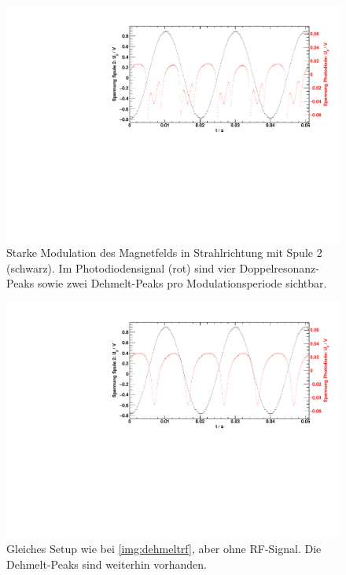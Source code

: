 \begin{figure}[H]
\begin{center}
  \includegraphics[width=\textwidth]{../img/part3/06.pdf}
  \caption{Starke Modulation des Magnetfelds in Strahlrichtung mit Spule 2 (schwarz).
   Im Photodiodensignal (rot) sind vier Doppelresonanz-Peaks sowie
   zwei Dehmelt-Peaks pro Modulationsperiode sichtbar.}
  \label{img:dehmeltrf}
\end{center}
\end{figure} 

\begin{figure}[H]
\begin{center}
  \includegraphics[width=\textwidth]{../img/part3/07.pdf}
  \caption{Gleiches Setup wie bei \autoref{img:dehmeltrf}, aber ohne RF-Signal.
  Die Dehmelt-Peaks sind weiterhin vorhanden.}
  \label{img:dehmelt}
\end{center}
\end{figure} 


